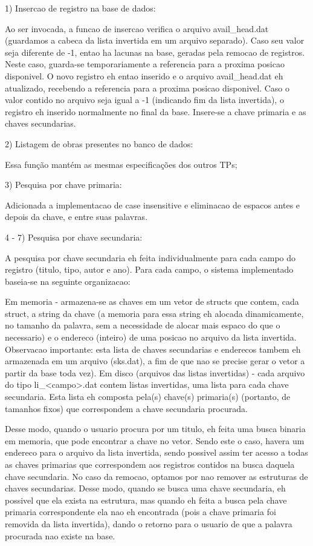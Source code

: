 \documentclass{article}
\begin{document}
1) Insercao de registro na base de dados:

Ao ser invocada, a funcao de insercao verifica o arquivo avail\_head.dat (guardamos a cabeca da lista invertida em um arquivo separado). 
Caso seu valor seja diferente de -1, entao ha lacunas na base, geradas pela remocao de registros.
Neste caso, guarda-se temporariamente a referencia para a proxima posicao disponivel. O novo registro eh entao inserido e o arquivo avail\_head.dat eh atualizado, recebendo a referencia para a proxima posicao disponivel.
Caso o valor contido no arquivo seja igual a -1 (indicando fim da lista invertida), o registro eh inserido normalmente no final da base.
Insere-se a chave primaria e as chaves secundarias.



2) Listagem de obras presentes no banco de dados:

Essa função mantém as mesmas especificações dos outros TPs;



3) Pesquisa por chave primaria:

Adicionada a implementacao de case insensitive e eliminacao de espacos antes e depois da chave, e entre suas palavras.



4 - 7) Pesquisa por chave secundaria:

A pesquisa por chave secundaria eh feita individualmente para cada campo do registro (titulo, tipo, autor e ano). Para cada campo, o sistema implementado baseia-se na seguinte organizacao:

Em memoria - armazena-se as chaves em um vetor de structs que contem, cada struct, a string da chave (a memoria para essa string eh alocada dinamicamente, no tamanho da palavra, sem a necessidade de alocar mais espaco do que o necessario) e o endereco (inteiro) de uma posicao no arquivo da lista invertida. Observacao importante: esta lista de chaves secundarias e enderecos tambem eh armazenada em um arquivo (sks.dat), a fim de que nao se precise gerar o vetor a partir da base toda vez).
Em disco (arquivos das listas invertidas) - cada arquivo do tipo li\_<campo>.dat contem listas invertidas, uma lista para cada chave secundaria. Esta lista eh composta pela(s) chave(s) primaria(s) (portanto, de tamanhos fixos) que correspondem a chave secundaria procurada.

Desse modo, quando o usuario procura por um titulo, eh feita uma busca binaria em memoria, que pode encontrar a chave no vetor. Sendo este o caso, havera um endereco para o arquivo da lista invertida, sendo possivel assim ter acesso a todas as chaves primarias que correspondem aos registros contidos na busca daquela chave secundaria.
No caso da remocao, optamos por nao remover as estruturas de chaves secundarias. Desse modo, quando se busca uma chave secundaria, eh possivel que ela exista na estrutura, mas quando eh feita a busca pela chave primaria correspondente ela nao eh encontrada (pois a chave primaria foi removida da lista invertida), dando o retorno para o usuario de que a palavra procurada nao existe na base.
\end{document}
